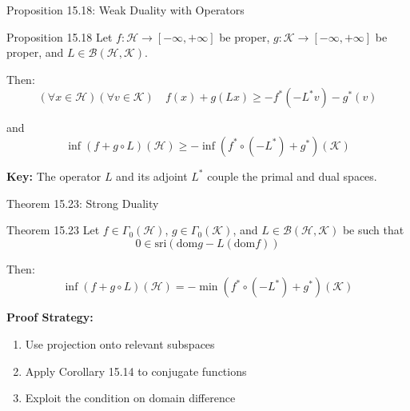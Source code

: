 \documentclass[aspectratio=169,10pt]{beamer}
\begin{document}
\begin{frame}{Proposition 15.18: Weak Duality with Operators}
  \begin{block}{Proposition 15.18}
    Let $f: \mathcal{H} \to [-\infty, +\infty]$ be proper, $g: \mathcal{K} \to [-\infty, +\infty]$ be proper, and $L \in \mathcal{B}(\mathcal{H}, \mathcal{K})$.
    
    Then:
    \[
      (\forall x \in \mathcal{H})(\forall v \in \mathcal{K}) \quad f(x) + g(Lx) \geq -f^*(-L^*v) - g^*(v)
    \]
    
    and
    \[
      \inf(f + g \circ L)(\mathcal{H}) \geq -\inf(f^* \circ (-L^*) + g^*)(\mathcal{K})
    \]
  \end{block}
  
  \vspace{0.3cm}
  \textbf{Key:} The operator $L$ and its adjoint $L^*$ couple the primal and dual spaces.
\end{frame}

\begin{frame}{Theorem 15.23: Strong Duality}
  \begin{block}{Theorem 15.23}
    Let $f \in \Gamma_0(\mathcal{H})$, $g \in \Gamma_0(\mathcal{K})$, and $L \in \mathcal{B}(\mathcal{H}, \mathcal{K})$ be such that
    \[
      0 \in \text{sri}(\text{dom} g - L(\text{dom} f))
    \]
    
    Then:
    \[
      \inf(f + g \circ L)(\mathcal{H}) = -\min(f^* \circ (-L^*) + g^*)(\mathcal{K})
    \]
  \end{block}
  
  \vspace{0.3cm}
  \textbf{Proof Strategy:}
  \begin{enumerate}
    \item Use projection onto relevant subspaces
    \item Apply Corollary 15.14 to conjugate functions
    \item Exploit the condition on domain difference
  \end{enumerate}
\end{frame}
\end{document}
